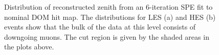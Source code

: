 \documentclass{gatech-thesis}
\begin{document}
\begin{figure}
\centering
{}
\caption{Distribution of reconstructed zenith from an 6-iteration SPE fit to nominal DOM hit map. The distributions for LES (a) and HES (b) events show that the bulk of the data at this level consists of downgoing muons. The cut region is given by the shaded areas in the plots above.} 
\label{fig:SPE6Recos}
\end{figure}
\end{document}
